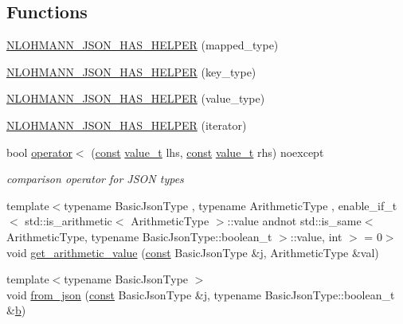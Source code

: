 \subsection*{Functions}
\begin{DoxyCompactItemize}
\item 
\hyperlink{namespacenlohmann_1_1detail_a7b2601c238073c43a07862768b319cf8}{N\+L\+O\+H\+M\+A\+N\+N\+\_\+\+J\+S\+O\+N\+\_\+\+H\+A\+S\+\_\+\+H\+E\+L\+P\+ER} (mapped\+\_\+type)
\item 
\hyperlink{namespacenlohmann_1_1detail_ad19328f0c4ffe2890ecafb7c89e0355b}{N\+L\+O\+H\+M\+A\+N\+N\+\_\+\+J\+S\+O\+N\+\_\+\+H\+A\+S\+\_\+\+H\+E\+L\+P\+ER} (key\+\_\+type)
\item 
\hyperlink{namespacenlohmann_1_1detail_af3e900eb1e0b107c812f7babbb94e69e}{N\+L\+O\+H\+M\+A\+N\+N\+\_\+\+J\+S\+O\+N\+\_\+\+H\+A\+S\+\_\+\+H\+E\+L\+P\+ER} (value\+\_\+type)
\item 
\hyperlink{namespacenlohmann_1_1detail_a6648328c4b1466fdc48f1fcfbff23e2f}{N\+L\+O\+H\+M\+A\+N\+N\+\_\+\+J\+S\+O\+N\+\_\+\+H\+A\+S\+\_\+\+H\+E\+L\+P\+ER} (iterator)
\item 
bool \hyperlink{namespacenlohmann_1_1detail_a09169efff3bd1771fff29bd92cea19e0}{operator$<$} (\hyperlink{functions__c_8js_afacfd9c985d225bb07483b887a801b6f}{const} \hyperlink{namespacenlohmann_1_1detail_a1ed8fc6239da25abcaf681d30ace4985}{value\+\_\+t} lhs, \hyperlink{functions__c_8js_afacfd9c985d225bb07483b887a801b6f}{const} \hyperlink{namespacenlohmann_1_1detail_a1ed8fc6239da25abcaf681d30ace4985}{value\+\_\+t} rhs) noexcept
\begin{DoxyCompactList}\small\item\em comparison operator for J\+S\+ON types \end{DoxyCompactList}\item 
{\footnotesize template$<$typename Basic\+Json\+Type , typename Arithmetic\+Type , enable\+\_\+if\+\_\+t$<$ std\+::is\+\_\+arithmetic$<$ Arithmetic\+Type $>$\+::value andnot std\+::is\+\_\+same$<$ Arithmetic\+Type, typename Basic\+Json\+Type\+::boolean\+\_\+t $>$\+::value, int $>$  = 0$>$ }\\void \hyperlink{namespacenlohmann_1_1detail_a85955b9c6dd31846e4b8e891f78614b6}{get\+\_\+arithmetic\+\_\+value} (\hyperlink{functions__c_8js_afacfd9c985d225bb07483b887a801b6f}{const} Basic\+Json\+Type \&j, Arithmetic\+Type \&val)
\item 
{\footnotesize template$<$typename Basic\+Json\+Type $>$ }\\void \hyperlink{namespacenlohmann_1_1detail_a58117f225f43d03e3a0a4a6f3d77c9d9}{from\+\_\+json} (\hyperlink{functions__c_8js_afacfd9c985d225bb07483b887a801b6f}{const} Basic\+Json\+Type \&j, typename Basic\+Json\+Type\+::boolean\+\_\+t \&\hyperlink{jquery_8js_a2fa551895933fae935a0a6b87282241d}{b})

\end{DoxyCompactItemize}
